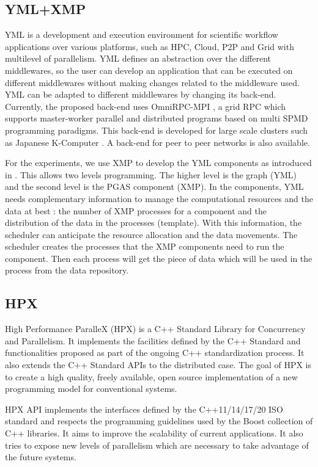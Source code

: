 \subsection{YML+XMP}
YML \cite{DelEP2006} is a development and execution environment for scientific workflow applications over various platforms, such as HPC, Cloud, P2P and Grid with multilevel of parallelism.
YML defines an abstraction over the different middlewares, so the user can develop an application that can be executed on different middlewares without making changes related to the middleware used.
YML can be adapted to different middlewares by changing its back-end.
Currently, the proposed back-end \cite{TsSHP2013} uses OmniRPC-MPI \cite{SaHTS2001}, a grid RPC which supports master-worker parallel and distributed programs based on multi SPMD programming paradigms.
This back-end is developed for large scale clusters such as Japanese K-Computer \cite{TsSHP2013}.
A back-end for peer to peer networks is also available.

For the experiments, we use XMP to develop the YML components as introduced in \cite{TsSHP2013}.
This allows two levels programming.
The higher level is the graph (YML) and the second level is the PGAS component (XMP).
In the components, YML needs complementary information to manage the computational resources and the data at best : the number of XMP processes for a component and the distribution of the data in the processes (template).
With this information, the scheduler can anticipate the resource allocation and the data movements.
The scheduler creates the processes that the XMP components need to run the component.
Then each process will get the piece of data which will be used in the process from the data repository.


\subsection{HPX}
High Performance ParalleX (HPX) \cite{KHASF2014} is a C++ Standard Library for Concurrency and Parallelism.
It implements the facilities defined by the C++ Standard and functionalities proposed as part of the ongoing C++ standardization process.
It also extends the C++ Standard APIs to the distributed case.
The goal of HPX is to create a high quality, freely available, open source implementation of a new programming model for conventional systems.

HPX API implements the interfaces defined by the C++11/14/17/20 ISO standard and respects the programming guidelines used by the Boost collection of C++ libraries.
It aims to improve the scalability of current applications.
It also tries to expose new levels of parallelism which are necessary to take advantage of the future systems.

